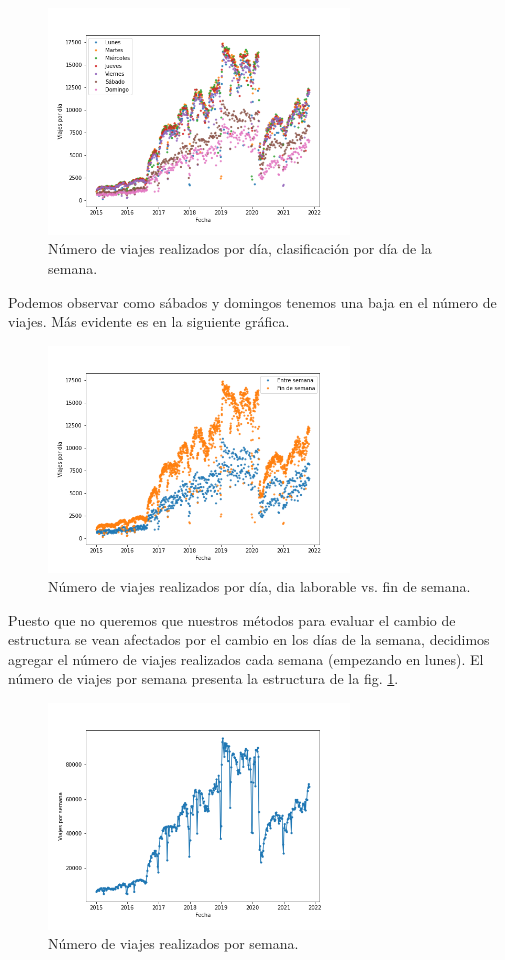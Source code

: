\documentclass[
]{article}
\begin{document}
\begin{figure}[!h]
\centering
\includegraphics[width=8cm, height=6cm]{../plots/trips_daily_by_day.png}
\caption{Número de viajes realizados por día, clasificación por día de la semana.}
\end{figure}

Podemos observar como sábados y domingos tenemos una baja en el número
de viajes. Más evidente es en la siguiente gráfica.

\begin{figure}[!h]
\centering
\includegraphics[width=8cm, height=6cm]{../plots/trips_daily_by_weekend.png}
\caption{Número de viajes realizados por día, dia laborable vs. fin de semana.}
\end{figure}

Puesto que no queremos que nuestros métodos para evaluar el cambio de
estructura se vean afectados por el cambio en los días de la semana,
decidimos agregar el número de viajes realizados cada semana (empezando
en lunes). El número de viajes por semana presenta la estructura de la
fig. \ref{fig-x}.

\begin{figure}[ht]
\centering
\includegraphics[width=8cm, height=6cm]{../plots/trips_weekly.png}
\caption{Número de viajes realizados por semana.} \label{fig-x}
\end{figure}
\end{document}
